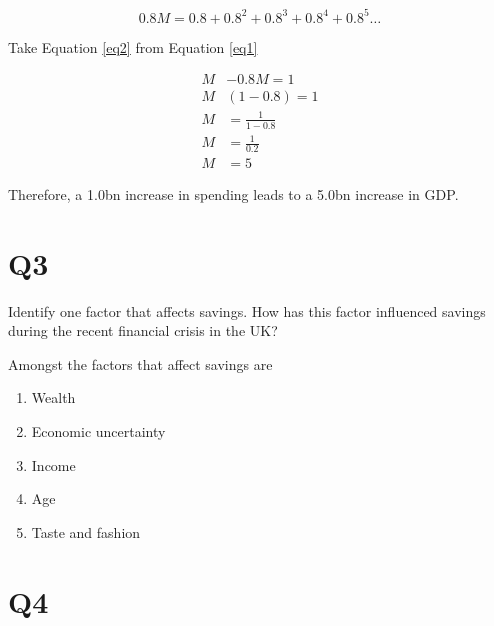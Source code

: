 \documentclass[12pt, a4paper, oneside]{article}\usepackage{graphicx, color}
\begin{document}
\begin{equation}\label{eq2}
0.8M = 0.8 + 0.8^2 +0.8^3 +0.8^4 +0.8^5 \dots
\end{equation}

Take Equation \ref{eq2} from Equation \ref{eq1}

\begin{align*}
M& - 0.8M =  1\\
M&(1 - 0.8) = 1\\
M& =  \frac{1}{1 - 0.8}\\
M& =  \frac{1}{0.2}\\
M& = 5
\end{align*}

Therefore, a \textsterling 1.0bn increase in spending leads to a \textsterling 5.0bn increase in GDP. 

\section*{Q3}
Identify one factor that affects savings.  How has this factor influenced savings during the recent financial crisis in the UK?

Amongst the factors that affect savings are 
\begin{enumerate}
\item Wealth
\item Economic uncertainty
\item Income
\item Age
\item Taste and fashion
\end{enumerate}

\section*{Q4}
\end{document}
